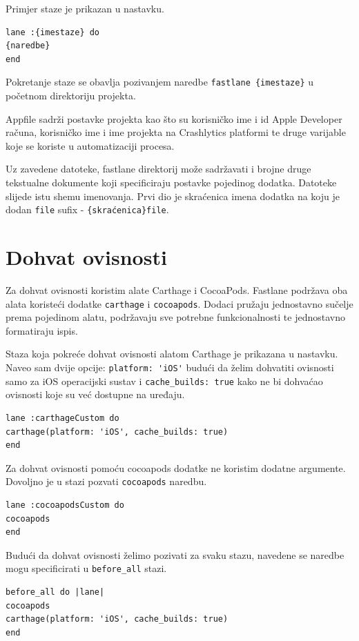 \documentclass[times, utf8, diplomski, numeric]{fer}
\begin{document}
\begin{appendices}
Primjer staze je prikazan u nastavku.

\begin{verbatim}
lane :{imestaze} do
{naredbe}
end
\end{verbatim}

Pokretanje staze se obavlja pozivanjem naredbe \verb|fastlane {imestaze}| u početnom direktoriju projekta.

Appfile sadrži postavke projekta kao što su korisničko ime i id Apple Developer računa, korisničko ime i ime projekta na Crashlytics platformi te druge varijable koje se koriste u automatizaciji procesa.

Uz zavedene datoteke, fastlane direktorij može sadržavati i brojne druge tekstualne dokumente koji specificiraju postavke pojedinog dodatka. Datoteke slijede istu shemu imenovanja. Prvi dio je skraćenica imena dodatka na koju je dodan \verb|file| sufix - \verb|{skraćenica}file|.

\section{Dohvat ovisnosti}

Za dohvat ovisnosti koristim alate Carthage i CocoaPods. Fastlane podržava oba alata koristeći dodatke \verb|carthage| i \verb|cocoapods|. Dodaci pružaju jednostavno sučelje prema pojedinom alatu, podržavaju sve potrebne funkcionalnosti te jednostavno formatiraju ispis.

Staza koja pokreće dohvat ovisnosti alatom Carthage je prikazana u nastavku. Naveo sam dvije opcije: \verb|platform: 'iOS'| budući da želim dohvatiti ovisnosti samo za iOS operacijski sustav i \verb|cache_builds: true| kako ne bi dohvaćao ovisnosti koje su već dostupne na uređaju.

\begin{verbatim}
lane :carthageCustom do
carthage(platform: 'iOS', cache_builds: true)
end
\end{verbatim}

Za dohvat ovisnosti pomoću cocoapods dodatke ne koristim dodatne argumente. Dovoljno je u stazi pozvati \verb|cocoapods| naredbu.

\begin{verbatim}
lane :cocoapodsCustom do
cocoapods
end
\end{verbatim}

Budući da dohvat ovisnosti želimo pozivati za svaku stazu, navedene se naredbe mogu specificirati u \verb|before_all| stazi.

\begin{verbatim}
before_all do |lane|
cocoapods
carthage(platform: 'iOS', cache_builds: true)
end
\end{verbatim}


\end{appendices}
\end{document}
